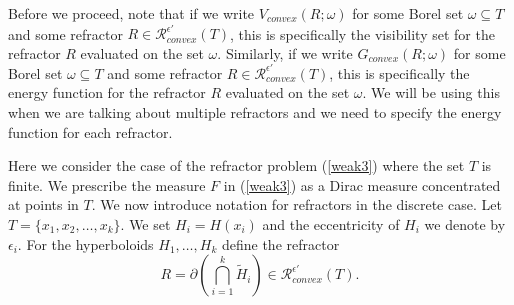 \documentclass[review]{elsarticle}
\DeclareMathOperator*{\Int}{Int}
\newcommand{\h}{\text{\calligra h}\,}
\begin{document}

Before we proceed, note that if we write $V_{convex}(R;\omega)$ for some Borel set $\omega\subseteq T$ and some refractor $R\in \mathcal{R}_{convex}^{\epsilon'}(T)$, this is specifically the visibility set for the refractor $R$ evaluated on the set $\omega$. Similarly, if we write $G_{convex}(R;\omega)$ for some Borel set $\omega\subseteq T$ and some refractor $R\in \mathcal{R}_{convex}^{\epsilon'}(T)$, this is specifically the energy function for the refractor $R$ evaluated on the set $\omega$. We will be using this when we are talking about multiple refractors and we need to specify the energy function for each refractor. 


Here we consider the case of the refractor problem (\ref{weak3}) where the set $T$ is finite. We prescribe the measure $F$ in (\ref{weak3}) as a Dirac measure concentrated at points in $T.$ We now introduce notation for refractors in the discrete case. Let $T=\{x_1,x_2,\dots,x_k\}$. We set $H_i = H(x_i)$ and the eccentricity of $H_i$ we denote by $\epsilon_i$. For the hyperboloids $H_1,\dots,H_k$ define the refractor
\begin{equation}
    R= \partial\left(\bigcap_{i=1}^k \tilde{H}_i\right)\in \mathcal{R}_{convex}^{\epsilon'}(T).
\end{equation}
\end{document}
